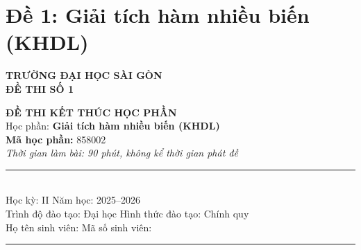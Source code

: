 ﻿%

\section*{Đề 1: Giải tích hàm nhiều biến (KHDL)}

\noindent
\begin{minipage}[t]{0.45\textwidth}
    \begin{center}
        \textbf{TRƯỜNG ĐẠI HỌC SÀI GÒN}\\[0.3cm]
        \textbf{ĐỀ THI SỐ 1}
    \end{center}
\end{minipage}
\hfill
\begin{minipage}[t]{0.5\textwidth}
    \begin{center}
        \textbf{ĐỀ THI KẾT THÚC HỌC PHẦN}\\[0.2cm]
        Học phần: \textbf{Giải tích hàm nhiều biến (KHDL)}\\
        \textbf{Mã học phần:} 858002\\[0.2cm]
        \textit{Thời gian làm bài: 90 phút, không kể thời gian phát đề}
    \end{center}
\end{minipage}

\vspace{0.8cm}

\noindent
\rule{\textwidth}{0.5pt}\\[0.2cm]
Học kỳ: II \dotfill Năm học: 2025--2026 \dotfill\\[0.2cm]
Trình độ đào tạo: Đại học \dotfill Hình thức đào tạo: Chính quy \dotfill\\[0.2cm]
Họ tên sinh viên: \dotfill Mã số sinh viên: \dotfill\\[0.2cm]
\rule{\textwidth}{0.5pt}

\vspace{0.8cm}

\begin{center}
\end{center}

